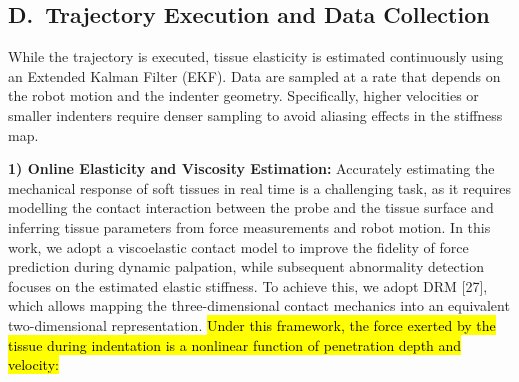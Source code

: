 \documentclass[11pt]{article}
\begin{document}
\subsection*{D.\ Trajectory Execution and Data Collection}

While the trajectory is executed, tissue elasticity is estimated
continuously using an Extended Kalman Filter (EKF). Data are sampled
at a rate that depends on the robot motion and the indenter geometry.
Specifically, higher velocities or smaller indenters require denser
sampling to avoid aliasing effects in the stiffness map.

\textbf{1) Online Elasticity and Viscosity Estimation:} Accurately
estimating the mechanical response of soft tissues in real time is a
challenging task, as it requires modelling the contact interaction
between the probe and the tissue surface and inferring tissue
parameters from force measurements and robot motion. In this work,
we adopt a viscoelastic contact model to improve the fidelity of
force prediction during dynamic palpation, while subsequent
abnormality detection focuses on the estimated elastic stiffness.
To achieve this, we adopt DRM [27], which allows mapping the
three-dimensional contact mechanics into an equivalent
two-dimensional representation. \hl{Under this framework, the force
exerted by the tissue during indentation is a nonlinear function of
penetration depth and velocity:}
\end{document}
